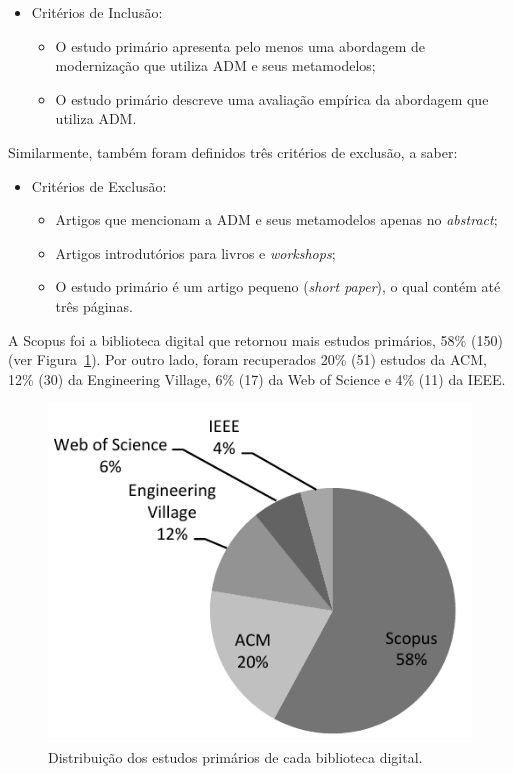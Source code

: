 \begin{itemize}
\item Critérios de Inclusão:
    \begin{itemize}
    \item O estudo primário apresenta pelo menos uma abordagem de modernização que utiliza ADM e seus metamodelos;
    \item O estudo primário descreve uma avaliação empírica da abordagem que utiliza ADM.
    \end{itemize}
\end{itemize}

Similarmente, também foram definidos três critérios de exclusão, a saber:

\begin{itemize}
\item Critérios de Exclusão:
    \begin{itemize}
    \item Artigos que mencionam a ADM e seus metamodelos apenas no \textit{abstract};
    \item Artigos introdutórios para livros e \textit{workshops};
    \item O estudo primário é um artigo pequeno (\textit{short paper}), o qual contém até três páginas.
    \end{itemize}
\end{itemize}

A Scopus foi a biblioteca digital que retornou mais estudos primários, 58\% (150) (ver Figura~\ref{fig:distribuicao_biblioteca_digital}). Por outro lado, foram recuperados 20\% (51) estudos da ACM, 12\% (30) da Engineering Village, 6\% (17) da Web of Science e 4\% (11) da IEEE. 

\begin{figure}[h]
 \caption{Distribuição dos estudos primários de cada biblioteca digital.}
 \label{fig:distribuicao_biblioteca_digital}
 \centering
 \includegraphics[scale=0.9]{images/retornoDasBasesMS}
 \fautor
\end{figure}

